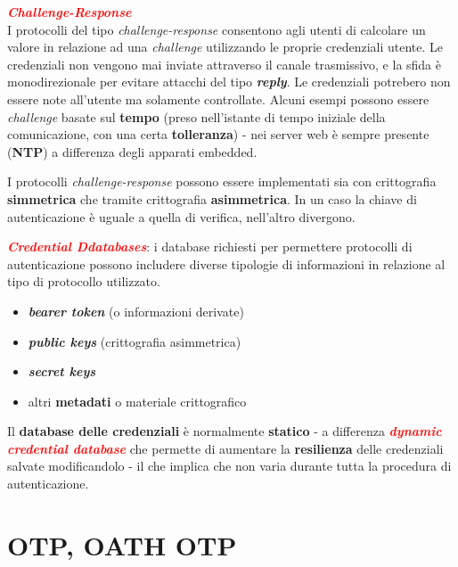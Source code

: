 \begin{flushleft}
    \textcolor{red}{\textbf{\textit{Challenge-Response}}} \\
    I protocolli del tipo \textit{challenge-response} consentono agli utenti di calcolare un valore in relazione ad una \textit{challenge} utilizzando le proprie credenziali utente. Le credenziali non vengono mai inviate attraverso il canale trasmissivo, e la sfida è monodirezionale per evitare attacchi del tipo \textbf{\textit{reply}}. Le credenziali potrebero non essere note all'utente ma solamente controllate. Alcuni esempi possono essere \textit{challenge} basate sul \textbf{tempo} (preso nell'istante di tempo iniziale della comunicazione, con una certa \textbf{tolleranza}) - nei server web è sempre presente (\textbf{NTP}) a differenza degli apparati embedded.

    \smallskip

    I protocolli \textit{challenge-response} possono essere implementati sia con crittografia \textbf{simmetrica} che tramite crittografia \textbf{asimmetrica}. In un caso la chiave di autenticazione è uguale a quella di verifica, nell'altro divergono.
\end{flushleft}

\begin{flushleft}
    \textcolor{red}{\textbf{\textit{Credential Ddatabases}}}: i database richiesti per permettere protocolli di autenticazione possono includere diverse tipologie di informazioni in relazione al tipo di protocollo utilizzato.
    \begin{itemize}[nosep]
        \item \textbf{\textit{bearer token}} (o informazioni derivate)
        \item \textbf{\textit{public keys}} (crittografia asimmetrica)
        \item \textbf{\textit{secret keys}}
        \item altri \textbf{metadati} o materiale crittografico
    \end{itemize}
    Il \textbf{database delle credenziali} è normalmente \textbf{statico} - a differenza \textcolor{red}{\textbf{\textit{dynamic credential database}}} che permette di aumentare la \textbf{resilienza} delle credenziali salvate modificandolo - il che implica che non varia durante tutta la procedura di autenticazione.
\end{flushleft}

\newpage

\section{OTP, OATH OTP}

